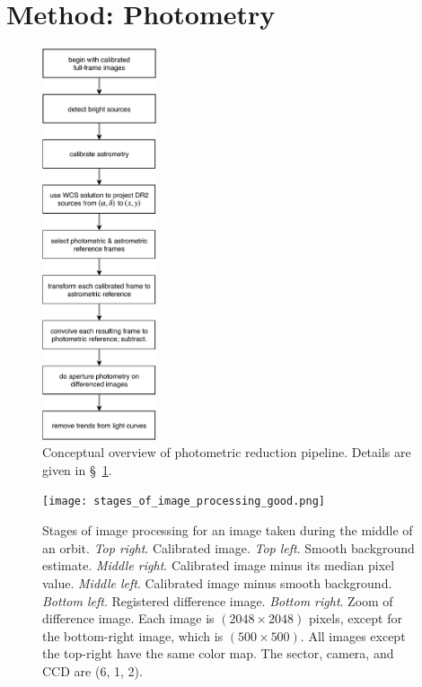 \documentclass[12pt,twocolumn,tighten]{aastex62}
\begin{document}
\section{Method: Photometry}
\label{sec:method}

\begin{figure}[!t]
	\begin{center}
		\leavevmode
		\includegraphics[width=0.3\textwidth]{pipelineoverview.pdf}
	\end{center}
	\vspace{-0.2cm}
	\caption{
    Conceptual overview of photometric reduction pipeline.
    Details are given in \S~\ref{sec:method}.
	\label{fig:pipeline}
	}
\end{figure}

\begin{figure}[!t]
    \begin{center}
        \leavevmode
        \texttt{[image: stages\_of\_image\_processing\_good.png]}
    \end{center}
    \vspace{-0.6cm}
    \caption{
        Stages of image processing for an image taken during the middle
        of an orbit.
        {\it Top right}. Calibrated image.
        {\it Top left}. Smooth background estimate.
        {\it Middle right}. Calibrated image minus its median pixel value.
        {\it Middle left}. Calibrated image minus smooth background.
        {\it Bottom left}. Registered difference image.
        {\it Bottom right}. Zoom of difference image.
        Each image is $(2048\times2048)$ pixels, except for the bottom-right 
        image, which is $(500\times500)$.
        All images except the top-right have the same color map.
        The sector, camera, and CCD are (6, 1, 2).
        \label{fig:stages_good}
    }
\end{figure}
\end{document}
